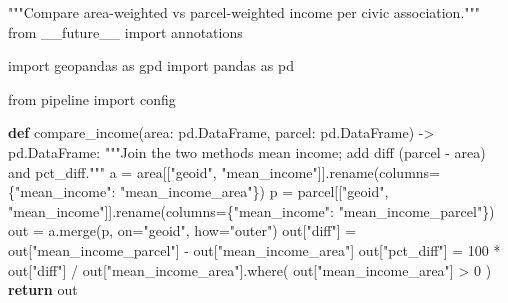 \documentclass[
  letterpaper,
  DIV=11,
  numbers=noendperiod]{scrreprt}
\newenvironment{Shaded}{\begin{snugshade}}{\end{snugshade}}
\newcommand{\CommentTok}[1]{\textcolor[rgb]{0.37,0.37,0.37}{#1}}
\newcommand{\ControlFlowTok}[1]{\textcolor[rgb]{0.00,0.23,0.31}{\textbf{#1}}}
\newcommand{\DecValTok}[1]{\textcolor[rgb]{0.68,0.00,0.00}{#1}}
\newcommand{\ImportTok}[1]{\textcolor[rgb]{0.00,0.46,0.62}{#1}}
\newcommand{\KeywordTok}[1]{\textcolor[rgb]{0.00,0.23,0.31}{\textbf{#1}}}
\newcommand{\NormalTok}[1]{\textcolor[rgb]{0.00,0.23,0.31}{#1}}
\newcommand{\OperatorTok}[1]{\textcolor[rgb]{0.37,0.37,0.37}{#1}}
\newcommand{\StringTok}[1]{\textcolor[rgb]{0.13,0.47,0.30}{#1}}
\begin{document}
\begin{Shaded}
\begin{Highlighting}[]
\CommentTok{"""Compare area{-}weighted vs parcel{-}weighted income per civic association."""}
\ImportTok{from}\NormalTok{ \_\_future\_\_ }\ImportTok{import}\NormalTok{ annotations}

\ImportTok{import}\NormalTok{ geopandas }\ImportTok{as}\NormalTok{ gpd}
\ImportTok{import}\NormalTok{ pandas }\ImportTok{as}\NormalTok{ pd}

\ImportTok{from}\NormalTok{ pipeline }\ImportTok{import}\NormalTok{ config}


\KeywordTok{def}\NormalTok{ compare\_income(area: pd.DataFrame, parcel: pd.DataFrame) }\OperatorTok{{-}\textgreater{}}\NormalTok{ pd.DataFrame:}
    \CommentTok{"""Join the two methods\textquotesingle{} mean income; add diff (parcel {-} area) and pct\_diff."""}
\NormalTok{    a }\OperatorTok{=}\NormalTok{ area[[}\StringTok{"geoid"}\NormalTok{, }\StringTok{"mean\_income"}\NormalTok{]].rename(columns}\OperatorTok{=}\NormalTok{\{}\StringTok{"mean\_income"}\NormalTok{: }\StringTok{"mean\_income\_area"}\NormalTok{\})}
\NormalTok{    p }\OperatorTok{=}\NormalTok{ parcel[[}\StringTok{"geoid"}\NormalTok{, }\StringTok{"mean\_income"}\NormalTok{]].rename(columns}\OperatorTok{=}\NormalTok{\{}\StringTok{"mean\_income"}\NormalTok{: }\StringTok{"mean\_income\_parcel"}\NormalTok{\})}
\NormalTok{    out }\OperatorTok{=}\NormalTok{ a.merge(p, on}\OperatorTok{=}\StringTok{"geoid"}\NormalTok{, how}\OperatorTok{=}\StringTok{"outer"}\NormalTok{)}
\NormalTok{    out[}\StringTok{"diff"}\NormalTok{] }\OperatorTok{=}\NormalTok{ out[}\StringTok{"mean\_income\_parcel"}\NormalTok{] }\OperatorTok{{-}}\NormalTok{ out[}\StringTok{"mean\_income\_area"}\NormalTok{]}
\NormalTok{    out[}\StringTok{"pct\_diff"}\NormalTok{] }\OperatorTok{=} \DecValTok{100} \OperatorTok{*}\NormalTok{ out[}\StringTok{"diff"}\NormalTok{] }\OperatorTok{/}\NormalTok{ out[}\StringTok{"mean\_income\_area"}\NormalTok{].where(}
\NormalTok{        out[}\StringTok{"mean\_income\_area"}\NormalTok{] }\OperatorTok{\textgreater{}} \DecValTok{0}
\NormalTok{    )}
    \ControlFlowTok{return}\NormalTok{ out}



\end{Highlighting}
\end{Shaded}
\end{document}

